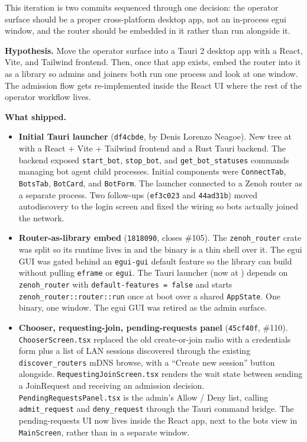\documentclass[11pt,a4paper]{article}
\begin{document}
This iteration is two commits sequenced through one decision: the
operator surface should be a proper cross-platform desktop app,
not an in-process egui window, and the router should be embedded
in it rather than run alongside it.

\textbf{Hypothesis.} Move the operator surface into a Tauri 2
desktop app with a React, Vite, and Tailwind frontend. Then,
once that app exists, embed the router into it as a library so
admins and joiners both run one process and look at one window.
The admission flow gets re-implemented inside the React UI where
the rest of the operator workflow lives.

\textbf{What shipped.}

\begin{itemize}[leftmargin=1.4em]
  \item \textbf{Initial Tauri launcher} (\texttt{df4cbde}, by Denis
        Lorenzo Neagoe). New tree at
         with a React +
        Vite + Tailwind frontend and a Rust Tauri backend. The
        backend exposed \texttt{start\_bot}, \texttt{stop\_bot},
        and \texttt{get\_bot\_statuses} commands managing bot
        agent child processes. Initial components were
        \texttt{ConnectTab}, \texttt{BotsTab}, \texttt{BotCard},
        and \texttt{BotForm}. The launcher connected to a Zenoh
        router as a separate process. Two follow-ups (\texttt{ef3c023}
        and \texttt{44ad31b}) moved autodiscovery to the login
        screen and fixed the wiring so bots actually joined the
        network.
  \item \textbf{Router-as-library embed} (\texttt{1818090}, closes
        \#105). The \texttt{zenoh\_router} crate was split so its
        runtime lives in  and
        the binary is a thin shell over it. The egui GUI was
        gated behind an \texttt{egui-gui} default feature so the
        library can build without pulling \texttt{eframe} or
        \texttt{egui}. The Tauri launcher (now at
        ) depends on
        \texttt{zenoh\_router} with
        \texttt{default-features = false} and starts
        \texttt{zenoh\_router::router::run} once at boot over a
        shared \texttt{AppState}. One binary, one window. The
        egui GUI was retired as the admin surface.
  \item \textbf{Chooser, requesting-join, pending-requests panel}
        (\texttt{45cf40f}, \#110). \texttt{ChooserScreen.tsx}
        replaced the old create-or-join radio with a credentials
        form plus a list of LAN sessions discovered through the
        existing \texttt{discover\_routers} mDNS browse, with a
        ``Create new session'' button alongside.
        \texttt{RequestingJoinScreen.tsx} renders the wait state
        between sending a JoinRequest and receiving an admission
        decision. \texttt{PendingRequestsPanel.tsx} is the
        admin's Allow / Deny list, calling
        \texttt{admit\_request} and \texttt{deny\_request}
        through the Tauri command bridge. The pending-requests
        UI now lives inside the React app, next to the bots view
        in \texttt{MainScreen}, rather than in a separate window.
\end{itemize}
\end{document}
